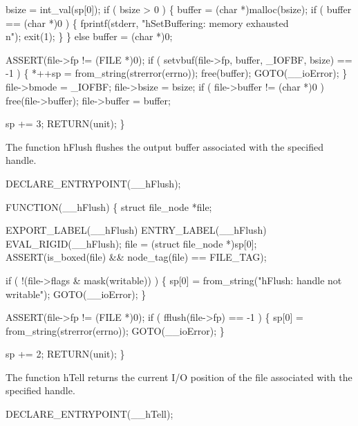     bsize = int_val(sp[0]);
    if ( bsize > 0 )
    \{
        buffer = (char *)malloc(bsize);
        if ( buffer == (char *)0 )
        \{
            fprintf(stderr, "hSetBuffering: memory exhausted\\n");
            exit(1);
        \}
    \}
    else
        buffer = (char *)0;

    ASSERT(file->fp != (FILE *)0);
    if ( setvbuf(file->fp, buffer, _IOFBF, bsize) == -1 )
    \{
        *++sp = from_string(strerror(errno));
        free(buffer);
        GOTO(__ioError);
    \}
    file->bmode = _IOFBF;
    file->bsize = bsize;
    if ( file->buffer != (char *)0 )
        free(file->buffer);
    file->buffer = buffer;

    sp += 3;
    RETURN(unit);
\}

\nwendcode{}\nwdocspar
The function {\Tt{}hFlush\nwendquote} flushes the output buffer associated with
the specified handle.

\nwenddocs{}\plusendmoddef\nwstartdeflinemarkup{}\nwenddeflinemarkup
DECLARE_ENTRYPOINT(__hFlush);

FUNCTION(__hFlush)
\{
    struct file_node *file;

    EXPORT_LABEL(__hFlush)
 ENTRY_LABEL(__hFlush)
    EVAL_RIGID(__hFlush);
    file = (struct file_node *)sp[0];
    ASSERT(is_boxed(file) && node_tag(file) == FILE_TAG);

    if ( !(file->flags & mask(writable)) )
    \{
        sp[0] = from_string("hFlush: handle not writable");
        GOTO(__ioError);
    \}

    ASSERT(file->fp != (FILE *)0);
    if ( fflush(file->fp) == -1 )
    \{
        sp[0] = from_string(strerror(errno));
        GOTO(__ioError);
    \}

    sp += 2;
    RETURN(unit);
\}

\nwendcode{}\nwdocspar
The function {\Tt{}hTell\nwendquote} returns the current I/O position of the file
associated with the specified handle.

\nwenddocs{}\plusendmoddef\nwstartdeflinemarkup{}\nwenddeflinemarkup
DECLARE_ENTRYPOINT(__hTell); 

